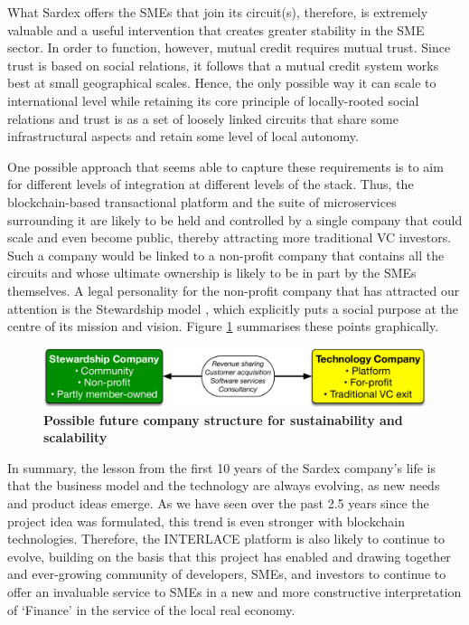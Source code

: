 What Sardex offers the SMEs that join its circuit(s), therefore, is extremely valuable and a useful intervention that creates greater stability in the SME sector. In order to function, however, mutual credit requires mutual trust. Since trust is based on social relations, it follows that a mutual credit system works best at small geographical scales. Hence, the only possible way it can scale to international level while retaining its core principle of locally-rooted social relations and trust is as a set of loosely linked circuits that share some infrastructural aspects and retain some level of local autonomy.

One possible approach that seems able to capture these requirements is to aim for different levels of integration at different levels of the stack. Thus, the blockchain-based transactional platform and the suite of microservices surrounding it are likely to be held and controlled by a single company that could scale and even become public, thereby attracting more traditional VC investors. Such a company would be linked to a non-profit company that contains all the circuits and whose ultimate ownership is likely to be in part by the SMEs themselves. A legal personality for the non-profit company that has attracted our attention is the Stewardship model \cite{Karns2011}, which explicitly puts a social purpose at the centre of its mission and vision. Figure \ref{fig:structure} summarises these points graphically.

\begin{figure}[h]
\vspace{-0.3cm}
\centering
\includegraphics[width=13 cm]{Figures/structure}
\caption{\bf \small Possible future company structure for sustainability and scalability}
\label{fig:structure}
\vspace{-0.5cm}
\end{figure}

In summary, the lesson from the first 10 years of the Sardex company's life is that the business model and the technology are always evolving, as new needs and product ideas emerge. As we have seen over the past 2.5 years since the project idea was formulated, this trend is even stronger with blockchain technologies. Therefore, the INTERLACE platform is also likely to continue to evolve, building on the basis that this project has enabled and drawing together and ever-growing community of developers, SMEs, and investors to continue to offer an invaluable service to SMEs in a new and more constructive interpretation of `Finance' in the service of the local real economy.



















